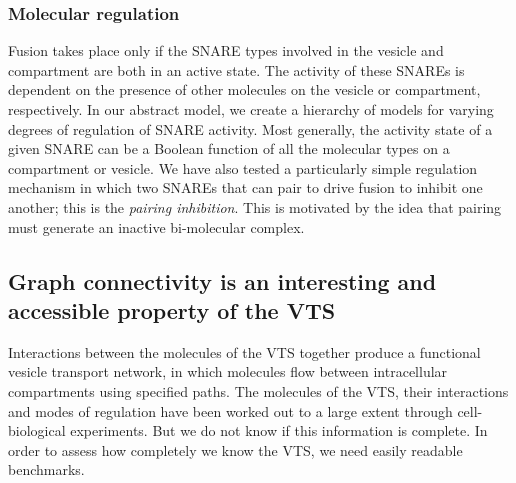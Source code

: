 \subsubsection{Molecular regulation} 
Fusion takes place only if the SNARE types involved in the vesicle and compartment are both in an active state.
%
The activity of these SNAREs is dependent on the presence of other molecules on the vesicle or compartment, respectively.
%
In our abstract model, 
we create a hierarchy of models for varying degrees of regulation of SNARE activity.
%
Most generally, the activity state of a given SNARE can be a Boolean function of all the molecular types on a compartment or vesicle. 
%
We have also tested \cite{shukla} a particularly simple regulation mechanism in which two SNAREs that can pair to drive fusion to inhibit one another; this is the \textit{pairing inhibition}. 
%
This is motivated by the idea that pairing must generate an inactive bi-molecular complex.
%



%
%
\subsection{Graph connectivity is an interesting and accessible property of the VTS} 
\noindent Interactions between the molecules of the VTS together produce a functional vesicle transport network, in which molecules flow between intracellular compartments using specified paths.
%
The molecules of the VTS, their interactions and modes of regulation have been worked out to a large extent through cell-biological experiments. 
%
But we do not know if this information is complete. In order to assess how completely we know the VTS, we need easily readable benchmarks. 

